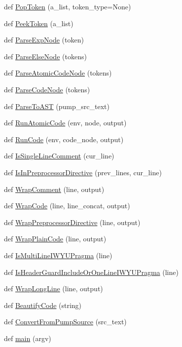 \begin{DoxyCompactItemize}
def \hyperlink{namespacepump_a45e1d5d5c1c188fc53eee8bd1e00e6b0}{Pop\+Token} (a\+\_\+list, token\+\_\+type=None)
\item 
def \hyperlink{namespacepump_ab12085e099ab4bd0cd968efdc435ec31}{Peek\+Token} (a\+\_\+list)
\item 
def \hyperlink{namespacepump_af62b08489d90e69d0577e82c98383ba7}{Parse\+Exp\+Node} (token)
\item 
def \hyperlink{namespacepump_ae40493525a993e81929c6905e329a406}{Parse\+Else\+Node} (tokens)
\item 
def \hyperlink{namespacepump_a5532710f334f026f80fc485decf5078e}{Parse\+Atomic\+Code\+Node} (tokens)
\item 
def \hyperlink{namespacepump_aabbc064b8664abbe05618b3a0f5a6c38}{Parse\+Code\+Node} (tokens)
\item 
def \hyperlink{namespacepump_a56ac10a83a3a875d305c9aae71fc0549}{Parse\+To\+A\+ST} (pump\+\_\+src\+\_\+text)
\item 
def \hyperlink{namespacepump_a901e6abd34691a0d779178a615cc09c1}{Run\+Atomic\+Code} (env, node, output)
\item 
def \hyperlink{namespacepump_ac6a714a44e28c2a19a1dfabeb9c9d4f1}{Run\+Code} (env, code\+\_\+node, output)
\item 
def \hyperlink{namespacepump_a417078b1d036b67756c47e5dc50324dc}{Is\+Single\+Line\+Comment} (cur\+\_\+line)
\item 
def \hyperlink{namespacepump_aa33101b01d5781710262f3b5dadd8bc8}{Is\+In\+Preprocessor\+Directive} (prev\+\_\+lines, cur\+\_\+line)
\item 
def \hyperlink{namespacepump_a73951c98652038351b1cd24291433e12}{Wrap\+Comment} (line, output)
\item 
def \hyperlink{namespacepump_a42502545a37fcd4513a0a7ac8ef3c0eb}{Wrap\+Code} (line, line\+\_\+concat, output)
\item 
def \hyperlink{namespacepump_a59e8ae06bae068d2d72df4f0340635d8}{Wrap\+Preprocessor\+Directive} (line, output)
\item 
def \hyperlink{namespacepump_a60723738cc38d8ced7e2cfecc72d8b11}{Wrap\+Plain\+Code} (line, output)
\item 
def \hyperlink{namespacepump_a707a3ff4514c89607e48a87589aed787}{Is\+Multi\+Line\+I\+W\+Y\+U\+Pragma} (line)
\item 
def \hyperlink{namespacepump_ac8a553b60dc83d100361a0e98d98451b}{Is\+Header\+Guard\+Include\+Or\+One\+Line\+I\+W\+Y\+U\+Pragma} (line)
\item 
def \hyperlink{namespacepump_a02427e2ddc80f0f408e27dfc3e38e702}{Wrap\+Long\+Line} (line, output)
\item 
def \hyperlink{namespacepump_a3456db8d85605892d670669c4e238cd7}{Beautify\+Code} (string)
\item 
def \hyperlink{namespacepump_a568fe53d1443489ac15bac4a0f9faf91}{Convert\+From\+Pump\+Source} (src\+\_\+text)
\item 
def \hyperlink{namespacepump_abcf26971f7bdbad77c2c168c110312df}{main} (argv)
\end{DoxyCompactItemize}
